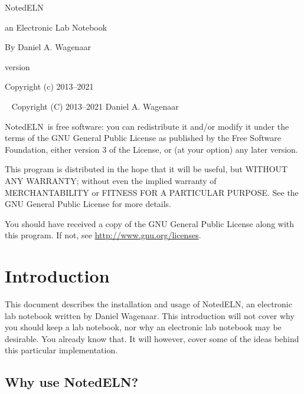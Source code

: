 \documentclass[11pt]{report}
\newcommand{\NotedELN}{NotedELN} %
\begin{document}
\thispagestyle{empty}
\begin{centering}
  {\Huge \NotedELN}
  \vskip30pt

  {\Large an Electronic Lab Notebook}
  \vskip60pt


  {\large By Daniel A. Wagenaar}
  \vfill

{\large version {}}
\vskip10pt


  {Copyright (c) 2013--2021}

\end{centering}
\pagebreak
~
\vfill
\noindent Copyright (C) 2013--2021 Daniel A. Wagenaar\medskip

\NotedELN\ is free software: you can redistribute it and/or modify
it under the terms of the GNU General Public License as published by
the Free Software Foundation, either version 3 of the License, or
(at your option) any later version.

This program is distributed in the hope that it will be useful,
but WITHOUT ANY WARRANTY; without even the implied warranty of
MERCHANTABILITY or FITNESS FOR A PARTICULAR PURPOSE.  See the
GNU General Public License for more details.

You should have received a copy of the GNU General Public License
along with this program.  If not, see \url{http://www.gnu.org/licenses}.
\pagebreak

\tableofcontents
\pagebreak

\chapter{Introduction}

This document describes the installation and usage of \NotedELN, an
electronic lab notebook written by Daniel Wagenaar.  This introduction
will not cover why you should keep a lab notebook, nor why an
electronic lab notebook may be desirable. You already know that.  It
will however, cover some of the ideas behind this particular
implementation.

\section{Why use \NotedELN?}
\end{document}

